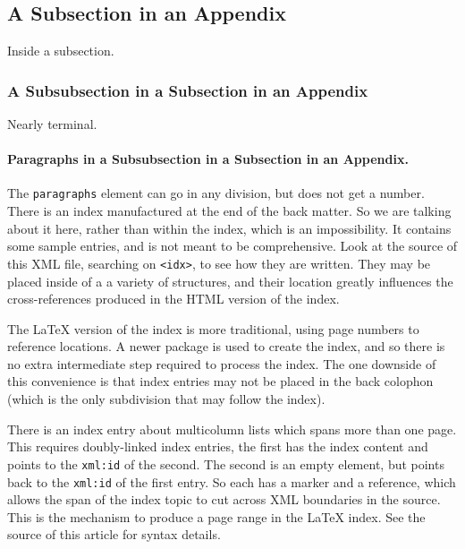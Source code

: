 \documentclass{amsart}
\theoremstyle{plain}%
\theoremstyle{definition}%
\theoremstyle{remark}%
\newcommand{\mono}[1]{\texttt{#1}}
\numberwithin{equation}{section}
\begin{document}
\begin{appendices}
\subsection{A Subsection in an Appendix}\label{appendix-structured-3}%
Inside a subsection.%
%
%
\typeout{************************************************}
\typeout{************************************************}
%
\subsubsection{A Subsubsection in a Subsection in an Appendix}\label{appendix-structured-3-3}%
Nearly terminal.%
\paragraph*{Paragraphs in a Subsubsection in a Subsection in an Appendix.}\label{appendix-structured-3-3-3}%
The \mono{paragraphs} element can go in any division, but does not get a number.%
%
%
\typeout{************************************************}
\typeout{************************************************}
%
\label{appendix-index}%
There is an index manufactured at the end of the back matter.  So we are talking about it here, rather than within the index, which is an impossibility.  It contains some sample entries, and is not meant to be comprehensive.  Look at the source of this XML file, searching on \mono{<idx>}, to see how they are written.  They may be placed inside of a a variety of structures, and their location greatly influences the cross-references produced in the HTML version of the index.%
\par
The \LaTeX{} version of the index is more traditional, using page numbers to reference locations.  A newer package is used to create the index, and so there is no extra intermediate step required to process the index.  The one downside of this convenience is that index entries may not be placed in the back colophon (which is the only subdivision that may follow the index).%
\par
There is an index entry about multicolumn lists which spans more than one page.  This requires doubly-linked index entries, the first has the index content and points to the \mono{xml:id} of the second.  The second is an empty element, but points back to the \mono{xml:id} of the first entry.  So each has a marker and a reference, which allows the span of the index topic to cut across XML boundaries in the source.  This is the mechanism to produce a page range in the \LaTeX{} index.  See the source of this article for syntax details.%

\end{appendices}
\end{document}
